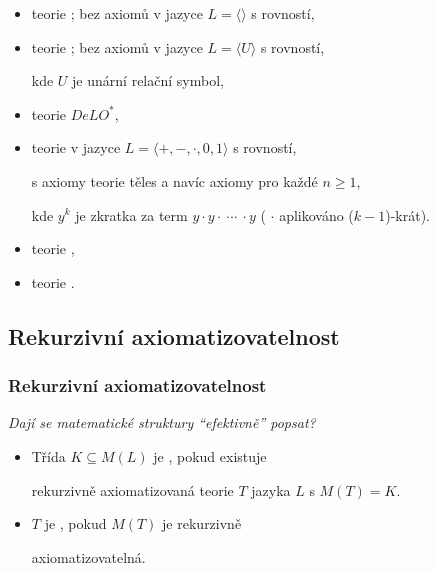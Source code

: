 \begin{itemize}
\item teorie ; bez axiomů v jazyce $L=\langle \rangle$ s rovností,
\smallskip

\item teorie ; bez axiomů v jazyce $L=\langle U \rangle$ s rovností,
\smallskip

kde $U$ je unární relační symbol,
\smallskip

\item teorie  $DeLO^*$,
\smallskip

\item teorie  v jazyce $L=\langle +,-,\cdot,0,1\rangle$ s rovností,
\smallskip

s axiomy teorie těles a navíc axiomy pro každé $n\ge 1$,



kde $y^k$ je zkratka za term $y\cdot y \cdot\ \dotsb\ \cdot y$ ( $\cdot$ aplikováno ($k-1$)-krát).
\smallskip

\item teorie ,
\smallskip

\item teorie .
\end{itemize}


\subsection{Rekurzivní axiomatizovatelnost}\todo

\subsubsection*{Rekurzivní axiomatizovatelnost}
    {\it Dají se matematické struktury ``efektivně'' popsat?}
    \smallskip
    
    \begin{itemize}
    \item Třída $K\subseteq M(L)$ je , pokud existuje
    \smallskip
    
    rekurzivně axiomatizovaná teorie $T$ jazyka $L$ s $M(T)=K$.
    \smallskip
    
    \item {} $T$ je , pokud $M(T)$ je
    rekurzivně
    \smallskip
    
    axiomatizovatelná.
    \end{itemize}
    
